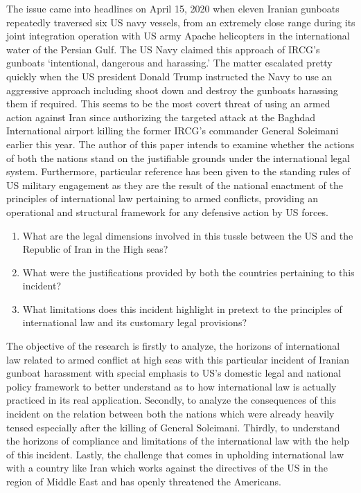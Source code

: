 \begin{multicols}{2}
\noi
The issue came into headlines on April 15, 2020 when eleven Iranian gunboats repeatedly
traversed six US navy vessels, from an extremely close range during its joint integration
operation with US army Apache helicopters in the international water of the Persian Gulf.
The US Navy claimed this approach of IRCG’s gunboats ‘intentional, dangerous and
harassing.’ The matter escalated pretty quickly when the US president Donald Trump
instructed the Navy to use an aggressive approach including shoot down and destroy the
gunboats harassing them if required. This seems to be the most covert threat of using an
armed action against Iran since authorizing the targeted attack at the Baghdad International
 airport killing the former IRCG’s commander General Soleimani earlier this year. The
author of this paper intends to examine whether the actions of both the nations stand on the
justifiable grounds under the international legal system. Furthermore, particular reference
has been given to the standing rules of US military engagement as they are the result of the
national enactment of the principles of international law pertaining to armed conflicts,
providing an operational and structural framework for any defensive action by US forces.


\vspace{-.2cm}

\begin{enumerate}[label=$\alph*)$]
\itemsep=0pt
\item What are the legal dimensions involved in this tussle between the US and the
Republic of Iran in the High seas?

\item  What were the justifications provided by both the countries pertaining to this incident?

\item What limitations does this incident highlight in pretext to the principles of
international law and its customary legal provisions? 
\end{enumerate}

\vspace{-.2cm}


\noi
The objective of the research is firstly to analyze, the horizons of international law related to
armed conflict at high seas with this particular incident of Iranian gunboat harassment with
special emphasis to US’s domestic legal and national policy framework to better understand
as to how international law is actually practiced in its real application. Secondly, to analyze
the consequences of this incident on the relation between both the nations which were
already heavily tensed especially after the killing of General Soleimani. Thirdly, to
understand the horizons of compliance and limitations of the international law with the help
of this incident. Lastly, the challenge that comes in upholding international law with a
country like Iran which works against the directives of the US in the region of Middle East
and has openly threatened the Americans.


\end{multicols}
